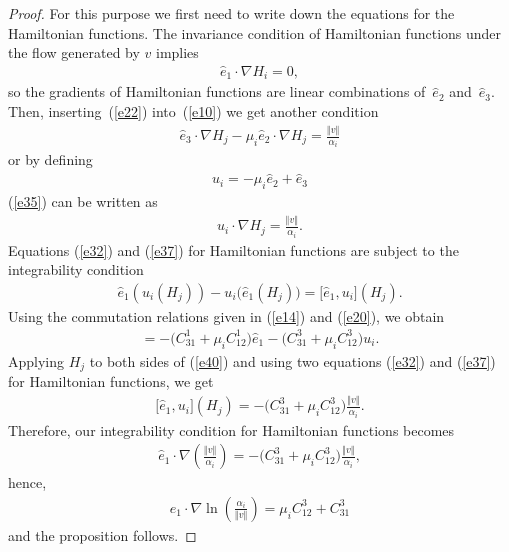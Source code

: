 \documentclass[pdftex]{sigma}
\numberwithin{equation}{section}
\begin{document}
\begin{proof}
For this purpose we f\/irst need to write down the equations for the Hamiltonian functions. The invariance condition of Hamiltonian functions under the f\/low generated by $v$ implies
\begin{gather}
\widehat{e}_{1}\cdot \nabla H_{i}=0, \label{e32}
\end{gather}
so the gradients of Hamiltonian functions are linear combinations of~$\widehat{e}_{2}$ and~$\widehat{e}_{3}$. Then, inser\-ting~(\ref{e22}) into~(\ref{e10}) we get another condition
\begin{gather}
\widehat{e}_{3}\cdot \nabla H_{j}-\mu _{i}\widehat{e}_{2}\cdot \nabla H_{j}=\frac{ \Vert v \Vert }{\alpha _{i}} \label{e35}
\end{gather}
or by def\/ining
\begin{gather*}
u_{i}=-\mu _{i}\widehat{e}_{2}+\widehat{e}_{3}
\end{gather*}
(\ref{e35}) can be written as
\begin{gather}
u_{i}\cdot \nabla H_{j}=\frac{\Vert v\Vert }{\alpha _{i}}.\label{e37}
\end{gather}
Equations (\ref{e32}) and (\ref{e37}) for Hamiltonian functions are subject to the integrability condition
\begin{gather*}
\widehat{e}_{1} ( u_{i}(H_{j}) ) -u_{i}\big( \widehat{e}_{1}(H_{j}) \big) =\big[ \widehat{e}_{1},u_{i}\big](H_{j}).
\end{gather*}
Using the commutation relations given in (\ref{e14}) and (\ref{e20}), we obtain
\begin{gather}
[ \widehat{e}_{1},u_{i}] =-\big( C_{31}^{1}+\mu_{i}C_{12}^{1}\big) \widehat{e}_{1}-\big(C_{31}^{3}+\mu_{i}C_{12}^{3}\big) u_{i}. \label{e40}
\end{gather}
Applying $H_{j}$ to both sides of (\ref{e40}) and using two equations (\ref{e32}) and (\ref{e37}) for Hamiltonian functions, we get
\begin{gather*}
\big[ \widehat{e}_{1},u_{i}\big] (H_{j}) =-\big(C_{31}^{3}+\mu _{i}C_{12}^{3}\big) \frac{\Vert v\Vert }{\alpha_{i}}. %
\end{gather*}
Therefore, our integrability condition for Hamiltonian functions becomes
\begin{gather*}
\widehat{e}_{1}\cdot \nabla \left( \frac{\Vert v\Vert }{\alpha_{i}}\right) =-\big( C_{31}^{3}+\mu _{i}C_{12}^{3}\big) \frac{\Vert v\Vert }{\alpha _{i}},
\end{gather*}
hence,
\begin{gather}
\widehat{e}_{1}\cdot \nabla \ln \left( \frac{\alpha _{i}}{\Vert v\Vert }\right) =\mu _{i}C_{12}^{3}+C_{31}^{3} \label{e43}
\end{gather}
and the proposition follows.
\end{proof}
\end{document}
